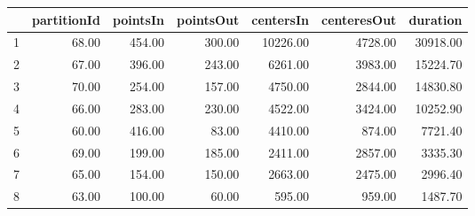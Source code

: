 \begin{table}[ht]
\centering
\begin{tabular}{rrrrrrr}
  \hline
 & partitionId & pointsIn & pointsOut & centersIn & centeresOut & duration \\ 
  \hline
1 & 68.00 & 454.00 & 300.00 & 10226.00 & 4728.00 & 30918.00 \\ 
  2 & 67.00 & 396.00 & 243.00 & 6261.00 & 3983.00 & 15224.70 \\ 
  3 & 70.00 & 254.00 & 157.00 & 4750.00 & 2844.00 & 14830.80 \\ 
  4 & 66.00 & 283.00 & 230.00 & 4522.00 & 3424.00 & 10252.90 \\ 
  5 & 60.00 & 416.00 & 83.00 & 4410.00 & 874.00 & 7721.40 \\ 
  6 & 69.00 & 199.00 & 185.00 & 2411.00 & 2857.00 & 3335.30 \\ 
  7 & 65.00 & 154.00 & 150.00 & 2663.00 & 2475.00 & 2996.40 \\ 
  8 & 63.00 & 100.00 & 60.00 & 595.00 & 959.00 & 1487.70 \\ 
   \hline
\end{tabular}
\end{table}
